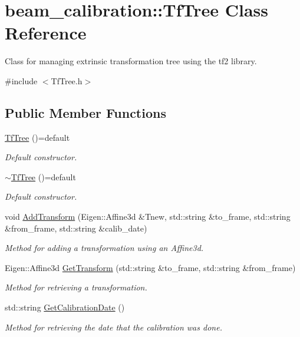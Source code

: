 \hypertarget{classbeam__calibration_1_1_tf_tree}{}\section{beam\+\_\+calibration\+:\+:Tf\+Tree Class Reference}
\label{classbeam__calibration_1_1_tf_tree}


Class for managing extrinsic transformation tree using the tf2 library.  




{\ttfamily \#include $<$Tf\+Tree.\+h$>$}

\subsection*{Public Member Functions}
\begin{DoxyCompactItemize}
\item 
\hyperlink{classbeam__calibration_1_1_tf_tree_aec864eabffcbeb3c0e914d3a90b2e671}{Tf\+Tree} ()=default
\begin{DoxyCompactList}\small\item\em Default constructor. \end{DoxyCompactList}\item 
\hyperlink{classbeam__calibration_1_1_tf_tree_a99292e90192a114388933b1d04346151}{$\sim$\+Tf\+Tree} ()=default
\begin{DoxyCompactList}\small\item\em Default constructor. \end{DoxyCompactList}\item 
void \hyperlink{classbeam__calibration_1_1_tf_tree_a25115497d8169ffec43a204770ca3436}{Add\+Transform} (Eigen\+::\+Affine3d \&Tnew, std\+::string \&to\+\_\+frame, std\+::string \&from\+\_\+frame, std\+::string \&calib\+\_\+date)
\begin{DoxyCompactList}\small\item\em Method for adding a transformation using an Affine3d. \end{DoxyCompactList}\item 
Eigen\+::\+Affine3d \hyperlink{classbeam__calibration_1_1_tf_tree_a4cc7847b4fa5a728327759446df7f14c}{Get\+Transform} (std\+::string \&to\+\_\+frame, std\+::string \&from\+\_\+frame)
\begin{DoxyCompactList}\small\item\em Method for retrieving a transformation. \end{DoxyCompactList}\item 
std\+::string \hyperlink{classbeam__calibration_1_1_tf_tree_aa8ea53149a8bc97ebf11d86448db17d5}{Get\+Calibration\+Date} ()
\begin{DoxyCompactList}\small\item\em Method for retrieving the date that the calibration was done. \end{DoxyCompactList}\end{DoxyCompactItemize}


